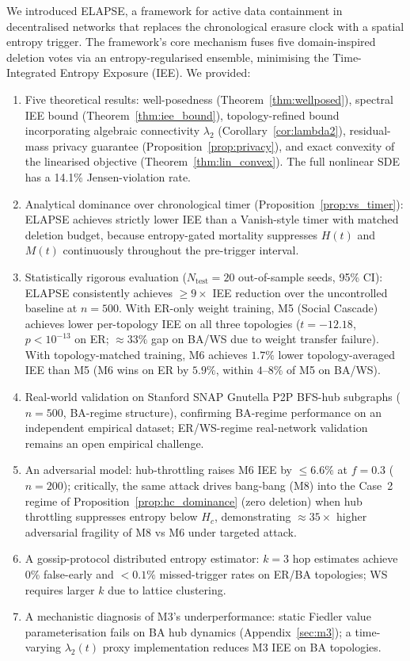 \documentclass[review,12pt]{elsarticle}
\newcommand{\Hc}{H_c}
\newcommand{\lambdat}{\lambda_2}
\begin{document}
We introduced ELAPSE, a framework for active data containment in
decentralised networks that replaces the chronological erasure clock with a
spatial entropy trigger. The framework's core mechanism fuses five
domain-inspired deletion votes via an entropy-regularised ensemble,
minimising the Time-Integrated Entropy Exposure (IEE). We provided:
\begin{enumerate}
  \item Five theoretical results: well-posedness (Theorem~\ref{thm:wellposed}),
        spectral IEE bound (Theorem~\ref{thm:iee_bound}), topology-refined
        bound incorporating algebraic connectivity $\lambda_2$
        (Corollary~\ref{cor:lambda2}), residual-mass privacy guarantee
        (Proposition~\ref{prop:privacy}), and exact convexity of the
        linearised objective (Theorem~\ref{thm:lin_convex}).
        The full nonlinear SDE has a 14.1\% Jensen-violation rate.
  \item Analytical dominance over chronological timer (Proposition~\ref{prop:vs_timer}):
        ELAPSE achieves strictly lower IEE than a Vanish-style timer with
        matched deletion budget, because entropy-gated mortality suppresses
        $H(t)$ and $M(t)$ continuously throughout the pre-trigger interval.
  \item Statistically rigorous evaluation ($N_{\mathrm{test}}=20$ out-of-sample
        seeds, 95\% CI): ELAPSE consistently achieves $\geq 9\times$ IEE
        reduction over the uncontrolled baseline at $n=500$.
        With ER-only weight training, M5 (Social Cascade) achieves lower
        per-topology IEE on all three topologies ($t=-12.18$, $p<10^{-13}$
        on ER; $\approx 33\%$ gap on BA/WS due to weight transfer failure).
        With topology-matched training, M6 achieves $1.7\%$ lower
        topology-averaged IEE than M5 (M6 wins on ER by $5.9\%$, within
        $4$--$8\%$ of M5 on BA/WS).
  \item Real-world validation on Stanford SNAP Gnutella P2P BFS-hub subgraphs
        ($n=500$, BA-regime structure), confirming BA-regime performance on
        an independent empirical dataset; ER/WS-regime real-network validation
        remains an open empirical challenge.
  \item An adversarial model: hub-throttling raises M6 IEE by $\leq 6.6\%$
        at $f=0.3$ ($n=200$); critically, the same attack drives
        bang-bang (M8) into the Case~2 regime of
        Proposition~\ref{prop:hc_dominance} (zero deletion) when hub throttling
        suppresses entropy below $\Hc$, demonstrating $\approx 35\times$ higher
        adversarial fragility of M8 vs M6 under targeted attack.
  \item A gossip-protocol distributed entropy estimator: $k=3$ hop estimates
        achieve 0\% false-early and $<0.1\%$ missed-trigger rates on ER/BA
        topologies; WS requires larger $k$ due to lattice clustering.
  \item A mechanistic diagnosis of M3's underperformance: static Fiedler
        value parameterisation fails on BA hub dynamics (Appendix~\ref{sec:m3});
        a time-varying $\lambdat(t)$ proxy implementation reduces M3 IEE
        on BA topologies.
\end{enumerate}
\end{document}
